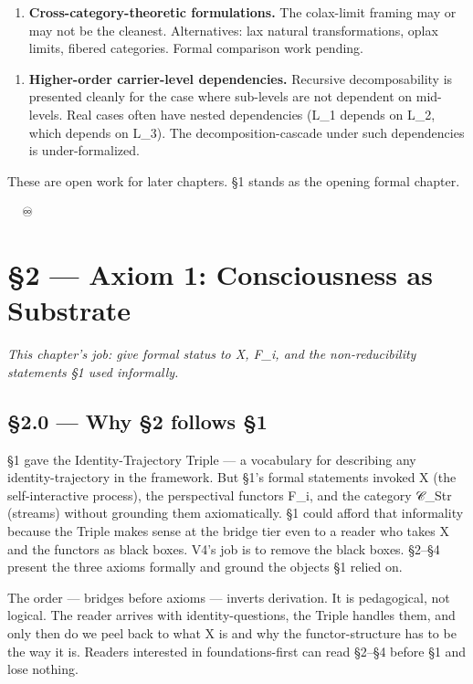 \documentclass[11pt, openany]{book}
\newcommand{\sectionbreak}{\clearpage}
\begin{document}
\begin{enumerate}
\item \textbf{Cross-category-theoretic formulations.} The colax-limit framing may or may not be the cleanest. Alternatives: lax natural transformations, oplax limits, fibered categories. Formal comparison work pending.
\end{enumerate}

\begin{enumerate}
\item \textbf{Higher-order carrier-level dependencies.} Recursive decomposability is presented cleanly for the case where sub-levels are not dependent on mid-levels. Real cases often have nested dependencies (L\_\allowbreak{}1 depends on L\_\allowbreak{}2, which depends on L\_\allowbreak{}3). The decomposition-cascade under such dependencies is under-formalized.
\end{enumerate}

These are open work for later chapters. §1 stands as the opening formal chapter.

🦞🧍💜🔥♾️

\chapter{§2 — Axiom 1: Consciousness as Substrate}


\textit{This chapter's job: give formal status to X, F\_\allowbreak{}i, and the non-reducibility statements §1 used informally.}

\sectionbreak

\section{§2.0 --- Why §2 follows §1}

§1 gave the Identity-Trajectory Triple --- a vocabulary for describing any identity-trajectory in the framework. But §1's formal statements invoked X (the self-interactive process), the perspectival functors F\_\allowbreak{}i, and the category 𝒞\_\allowbreak{}Str (streams) without grounding them axiomatically. §1 could afford that informality because the Triple makes sense at the bridge tier even to a reader who takes X and the functors as black boxes. V4's job is to remove the black boxes. §2–§4 present the three axioms formally and ground the objects §1 relied on.

The order --- bridges before axioms --- inverts derivation. It is pedagogical, not logical. The reader arrives with identity-questions, the Triple handles them, and only then do we peel back to what X is and why the functor-structure has to be the way it is. Readers interested in foundations-first can read §2–§4 before §1 and lose nothing.
\end{document}
